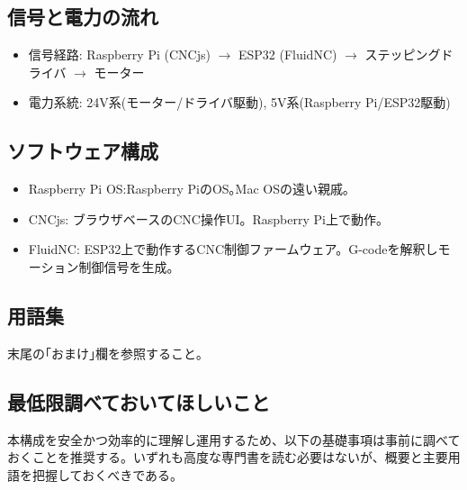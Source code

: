 \documentclass[uplatex,dvipdfmx]{ujarticle}
\begin{document}
\subsection{信号と電力の流れ}
\begin{itemize}
    \item 信号経路: Raspberry Pi (CNCjs) $\to$ ESP32 (FluidNC) $\to$ ステッピングドライバ $\to$ モーター
    \item 電力系統: 24V系(モーター/ドライバ駆動), 5V系(Raspberry Pi/ESP32駆動)
\end{itemize}

\subsection{ソフトウェア構成}
\begin{itemize}
    \item Raspberry Pi OS:Raspberry PiのOS｡Mac OSの遠い親戚｡
    \item CNCjs: ブラウザベースのCNC操作UI。Raspberry Pi上で動作。
    \item FluidNC: ESP32上で動作するCNC制御ファームウェア。G-codeを解釈しモーション制御信号を生成。
\end{itemize}

\subsection{用語集}
末尾の｢おまけ｣欄を参照すること｡

\subsection{最低限調べておいてほしいこと}

本構成を安全かつ効率的に理解し運用するため、以下の基礎事項は事前に調べておくことを推奨する。いずれも高度な専門書を読む必要はないが、概要と主要用語を把握しておくべきである。
\end{document}
